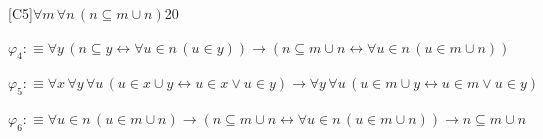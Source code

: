 \begin{fullproof}{[C5]}{$\forall m\,\forall n\,(n \subseteq m \cup n)$}{20}
\begin{abbrevlist}
\item $\varphi_{4} :\equiv \forall y\,(n \subseteq y \leftrightarrow \forall u \in n\,(u \in y)) \to (n \subseteq m \cup n \leftrightarrow \forall u \in n\,(u \in m \cup n))$
\item $\varphi_{5} :\equiv \forall x\,\forall y\,\forall u\,(u \in x \cup y \leftrightarrow u \in x \lor u \in y) \to \forall y\,\forall u\,(u \in m \cup y \leftrightarrow u \in m \lor u \in y)$
\item $\varphi_{6} :\equiv \forall u \in n\,(u \in m \cup n) \to (n \subseteq m \cup n \leftrightarrow \forall u \in n\,(u \in m \cup n)) \to n \subseteq m \cup n$
\end{abbrevlist}
\end{fullproof}
